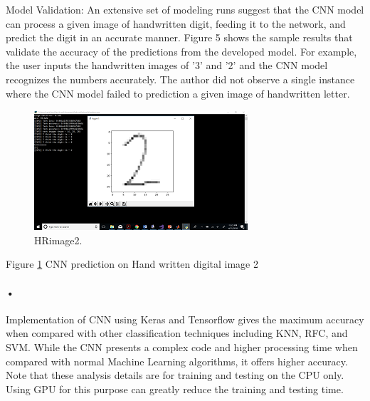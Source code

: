 \documentclass{article}
\begin{document}
\begin{center}
Model Validation: An extensive set of modeling runs suggest that the CNN model can process a given image of handwritten digit, feeding it to the network, and predict the digit in an accurate manner. Figure 5 shows the sample results that validate the accuracy of the predictions from the developed model. For example, the user inputs the handwritten images of '3' and '2' and the CNN model recognizes the numbers accurately. The author did not observe a single instance where the CNN model failed to prediction a given image of handwritten letter.
\end{center}


\begin{figure}
  \includegraphics[width=\linewidth]{HRimg2.png}
  \caption{HRimage2.}
  \label{fig:HRimage2}
\end{figure}

Figure \ref{fig:HRimage2} CNN prediction on Hand written digital image 2


\paragraph{•}

Implementation of CNN using Keras and Tensorflow gives the maximum accuracy when compared with other classification techniques including KNN, RFC, and SVM. While the CNN presents a complex code and higher  processing time when compared with normal Machine Learning algorithms, it offers higher accuracy. Note that these analysis details are for training and testing on the CPU only. Using GPU for this purpose can greatly reduce the training and testing time.
\end{document}
